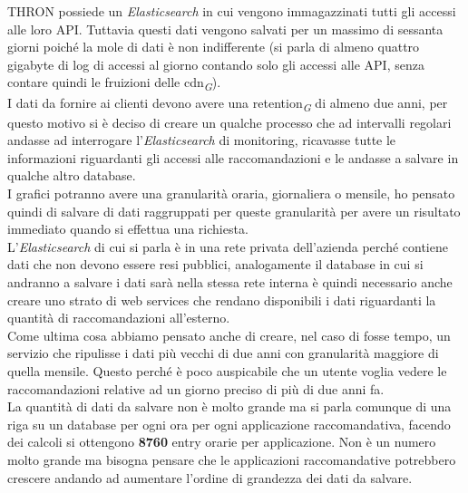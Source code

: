 \documentclass[a4paper, 12pt, twoside, openright]{book}
\newcommand{\gloss}[1]{#1\textsubscript{\textit{\tiny{G}}}}
\begin{document}
THRON possiede un \textit{Elasticsearch} in cui vengono immagazzinati tutti gli accessi alle loro API. Tuttavia questi dati vengono salvati per un massimo di sessanta giorni poiché la mole di dati è non indifferente (si parla di almeno quattro gigabyte di log di accessi al giorno contando solo gli accessi alle API, senza contare quindi le fruizioni delle \gloss{cdn}).\\
I dati da fornire ai clienti devono avere una \gloss{retention} di almeno due anni, per questo motivo si è deciso di creare un qualche processo che ad intervalli regolari andasse ad interrogare l'\textit{Elasticsearch} di monitoring, ricavasse tutte le informazioni riguardanti gli accessi alle raccomandazioni e le andasse a salvare in qualche altro database.\\
I grafici potranno avere una granularità oraria, giornaliera o mensile, ho pensato quindi di salvare di dati raggruppati per queste granularità per avere un risultato immediato quando si effettua una richiesta.\\
L'\textit{Elasticsearch} di cui si parla è in una rete privata dell'azienda perché contiene dati che non devono essere resi pubblici, analogamente il database in cui si andranno a salvare i dati sarà nella stessa rete interna è quindi necessario anche creare uno strato di web services che rendano disponibili i dati riguardanti la quantità di raccomandazioni all'esterno.\\

Come ultima cosa abbiamo pensato anche di creare, nel caso di fosse tempo, un servizio che ripulisse i dati più vecchi di due anni con granularità maggiore di quella mensile. Questo perché è poco auspicabile che un utente voglia vedere le raccomandazioni relative ad un giorno preciso di più di due anni fa.\\
La quantità di dati da salvare non è molto grande ma si parla comunque di una riga su un database per ogni ora per ogni applicazione raccomandativa, facendo dei calcoli si ottengono \textbf{8760} entry orarie per applicazione. Non è un numero molto grande ma bisogna pensare che le applicazioni raccomandative potrebbero crescere andando ad aumentare l'ordine di grandezza dei dati da salvare.\\
\end{document}
